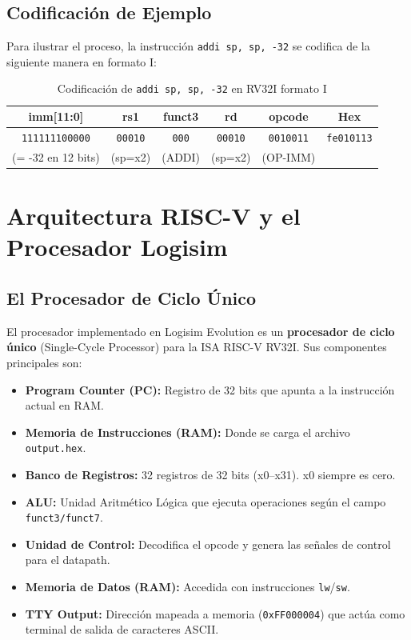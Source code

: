 \subsection{Codificación de Ejemplo}

Para ilustrar el proceso, la instrucción \texttt{addi sp, sp, -32} se codifica de la siguiente manera en formato I:

\begin{table}[H]
\centering
\begin{tabular}{ccccc|c}
\toprule
\textbf{imm[11:0]} & \textbf{rs1} & \textbf{funct3} & \textbf{rd} & \textbf{opcode} & \textbf{Hex} \\
\midrule
\texttt{111111100000} & \texttt{00010} & \texttt{000} & \texttt{00010} & \texttt{0010011} & \texttt{fe010113} \\
(= -32 en 12 bits) & (sp=x2) & (ADDI) & (sp=x2) & (OP-IMM) & \\
\bottomrule
\end{tabular}
\caption{Codificación de \texttt{addi sp, sp, -32} en RV32I formato I}
\label{tab:codificacion-I}
\end{table}

\section{Arquitectura RISC-V y el Procesador Logisim}

\subsection{El Procesador de Ciclo Único}

El procesador implementado en Logisim Evolution es un \textbf{procesador de ciclo único} (Single-Cycle Processor) para la ISA RISC-V RV32I. Sus componentes principales son:

\begin{itemize}
    \item \textbf{Program Counter (PC):} Registro de 32 bits que apunta a la instrucción actual en RAM.
    \item \textbf{Memoria de Instrucciones (RAM):} Donde se carga el archivo \texttt{output.hex}.
    \item \textbf{Banco de Registros:} 32 registros de 32 bits (x0--x31). x0 siempre es cero.
    \item \textbf{ALU:} Unidad Aritmético Lógica que ejecuta operaciones según el campo \texttt{funct3/funct7}.
    \item \textbf{Unidad de Control:} Decodifica el opcode y genera las señales de control para el datapath.
    \item \textbf{Memoria de Datos (RAM):} Accedida con instrucciones \texttt{lw}/\texttt{sw}.
    \item \textbf{TTY Output:} Dirección mapeada a memoria (\texttt{0xFF000004}) que actúa como terminal de salida de caracteres ASCII.
\end{itemize}

